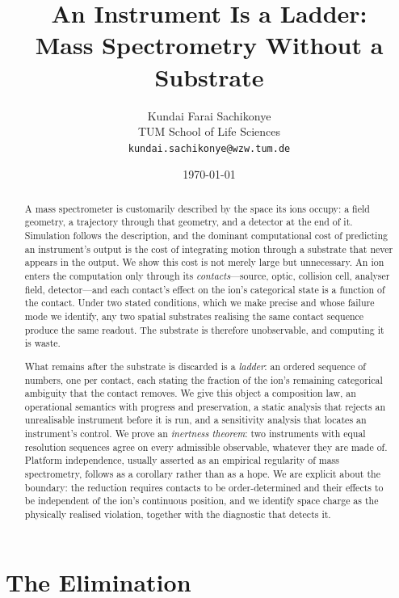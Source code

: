 \documentclass[11pt,a4paper]{article}
\title{An Instrument Is a Ladder:\\
Mass Spectrometry Without a Substrate}
\author{Kundai Farai Sachikonye\\
\small TUM School of Life Sciences\\
\small \texttt{kundai.sachikonye@wzw.tum.de}}
\date{\today}
\theoremstyle{plain}
\theoremstyle{definition}
\theoremstyle{remark}
\begin{document}
\maketitle

\begin{abstract}
A mass spectrometer is customarily described by the space its ions occupy: a
field geometry, a trajectory through that geometry, and a detector at the end of
it. Simulation follows the description, and the dominant computational cost of
predicting an instrument's output is the cost of integrating motion through a
substrate that never appears in the output. We show this cost is not merely
large but unnecessary. An ion enters the computation only through its
\emph{contacts}---source, optic, collision cell, analyser field, detector---and
each contact's effect on the ion's categorical state is a function of the
contact. Under two stated conditions, which we make precise and whose failure
mode we identify, any two spatial substrates realising the same contact sequence
produce the same readout. The substrate is therefore unobservable, and computing
it is waste.

What remains after the substrate is discarded is a \emph{ladder}: an ordered
sequence of numbers, one per contact, each stating the fraction of the ion's
remaining categorical ambiguity that the contact removes. We give this object a
composition law, an operational semantics with progress and preservation, a
static analysis that rejects an unrealisable instrument before it is run, and a
sensitivity analysis that locates an instrument's control. We prove an
\emph{inertness theorem}: two instruments with equal resolution sequences agree
on every admissible observable, whatever they are made of. Platform independence,
usually asserted as an empirical regularity of mass spectrometry, follows as a
corollary rather than as a hope. We are explicit about the boundary: the
reduction requires contacts to be order-determined and their effects to be
independent of the ion's continuous position, and we identify space charge as
the physically realised violation, together with the diagnostic that detects it.
\end{abstract}

\tableofcontents

\part{The Elimination}
\label{part:elimination}
\end{document}
